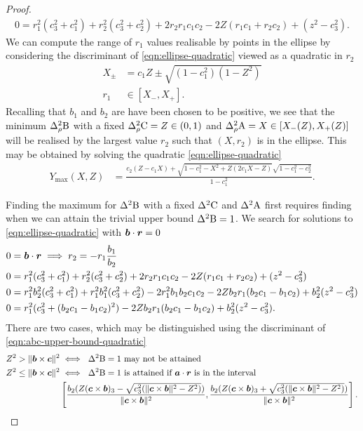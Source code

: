 \begin{proof}
\begin{align}
  \label{eqn:ellipse-quadratic}
  0 = r_1^2(c_3^2 + c_1^2) + r_2^2(c_3^2 + c_2^2) + 2 r_2 r_1 c_1 c_2 - 2 Z (r_1 c_1 + r_2 c_2) + (z^2 - c_3^2).
\end{align}
We can compute the range of $r_1$ values realisable by points in the ellipse by considering the discriminant of \eqref{eqn:ellipse-quadratic} viewed as a quadratic in $r_2$
\begin{align}
  X_\pm &= c_1 Z \pm \sqrt{(1-c_1^2)(1-Z^2)}\\
  r_1 &\in [X_- , X_+].
\end{align}
Recalling that $b_1$ and $b_2$ are have been chosen to be positive, we see that the minimum $\varr{\opb}$ with a fixed $\varr{\opc} = Z\in (0,1)$ and $\varr{\opa} = X\in [X_-(Z), X_+(Z)]$ will be realised by the largest value $r_2$ such that $(X, r_2)$ is in the ellipse. This may be obtained by solving the quadratic \eqref{eqn:ellipse-quadratic}
\begin{align}
Y_\text{max}(X,Z) &= \frac{c_2( Z - c_1 X) + \sqrt{1-c_1^2 - X^2 + Z(2c_1 X - Z)}\sqrt{1-c_1^2 - c_2^2}}{1-c_1^2}.
\end{align}

Finding the maximum for $\var{\opb}$ with a fixed $\var{\opc}$ and $\var{\opa}$ first requires finding when we can attain the trivial upper bound $\var{\opb} = 1$. We search for solutions to \eqref{eqn:ellipse-quadratic} with $\bm{b}\cdot\bm{r} = 0$
\begin{align}
  0 &= \bm{b}\cdot\bm{r} \implies r_2 = -r_1 \frac{b_1}{b_2}\\
  0 &= r_1^2(c_3^2 + c_1^2) + r_2^2(c_3^2 + c_2^2) + 2 r_2 r_1 c_1 c_2 - 2 Z (r_1 c_1 + r_2 c_2) + (z^2 - c_3^2)\\
  0 &= r_1^2b_2^2(c_3^2 + c_1^2) + r_1^2 b_1^2(c_3^2 + c_2^2) - 2 r_1^2 b_1 b_2  c_1 c_2 - 2 Z b_2 r_1 ( b_2 c_1 - b_1 c_2) + b_2^2(z^2 - c_3^2)\\
  0 &= r_1^2 (c_3^2 + (b_2 c_1 - b_1 c_2)^2 ) - 2 Z b_2 r_1 ( b_2 c_1 - b_1 c_2) + b_2^2(z^2 - c_3^2).
      \label{eqn:abc-upper-bound-quadratic}
\end{align}
There are two cases, which may be distinguished using the discriminant of \eqref{eqn:abc-upper-bound-quadratic}
\begin{align}
  Z^2 > \|\bob\times\boc\|^2 &\iff \text{ $\var{\opb} = 1$ may not be attained}\\
  Z^2 \leq \|\bob\times\boc\|^2 &\iff \text{ $\var{\opb} = 1$ is attained if $\boa\cdot\bor$ is in the interval } \\ & \left[\frac{b_2(Z(\boc\times\bob)_3 - \sqrt{c_3^2 (\|\boc\times\bob\|^2 - Z^2)})}{\|\boc\times\bob\|^2},\frac{b_2(Z(\boc\times\bob)_3 + \sqrt{c_3^2 (\|\boc\times\bob\|^2 - Z^2)})}{\|\boc\times\bob\|^2}\right].
\end{align}
\end{proof}

